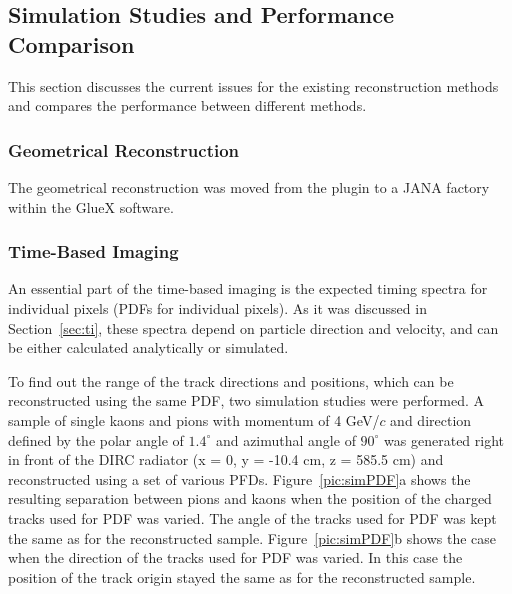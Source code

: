 \subsection{Simulation Studies and Performance Comparison}
\label{sec:com}

This section discusses the current issues for the existing reconstruction methods and compares the performance between different methods.

\subsubsection{Geometrical Reconstruction}

The geometrical reconstruction was moved from the plugin to a JANA factory within the GlueX software. 

\subsubsection{Time-Based Imaging}

An essential part of the time-based imaging is the expected timing spectra for individual pixels (PDFs for individual pixels). As it was discussed in Section~\ref{sec:ti}, these spectra depend on particle direction and velocity, and can be either calculated analytically or simulated.



To find out the range of the track directions and positions, which can be reconstructed using the same PDF, two simulation studies were performed. A sample of single kaons and pions with momentum of 4 GeV/$c$ and direction defined by the polar angle of $1.4^{\circ}$ and azimuthal angle of $90^{\circ}$ was generated right in front of the DIRC radiator (x = 0, y = -10.4 cm, z = 585.5 cm) and reconstructed using a set of various PFDs. Figure~\ref{pic:simPDF}a shows the resulting separation between pions and kaons when the position of the charged tracks used for PDF was varied. The angle of the tracks used for PDF was kept the same as for the reconstructed sample. Figure~\ref{pic:simPDF}b shows the case when the direction of the tracks used for PDF was varied. In this case the position of the track origin stayed the same as for the reconstructed sample.

